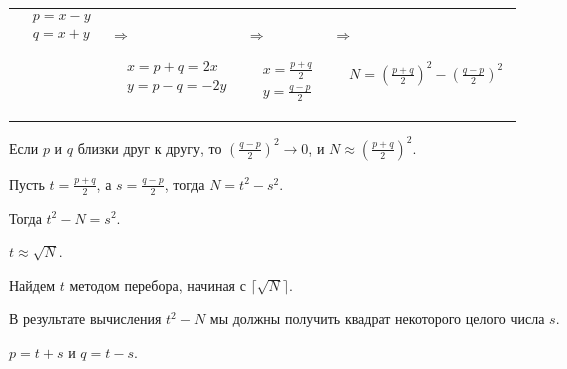 \documentclass[a4paper, 14pt]{report}
\begin{document}
\begin{center}
    \begin{tabularx}{\textwidth}{p{4em}|p{10em}|p{8em}|p{15em}}
        $\begin{aligned}
                  & p = x - y \\
                  & q = x + y \\
             \end{aligned}$          &
        \begin{minipage}{1em}
            $\Rightarrow$
        \end{minipage}
        $\begin{aligned}
                  & x = p + q = 2x  \\
                  & y = p - q = -2y \\
             \end{aligned}$     &
        \begin{minipage}{1em}
            $\Rightarrow$
        \end{minipage}
        $\begin{aligned}
                  & x = \frac{p + q}{2} \\
                  & y = \frac{q - p}{2}
             \end{aligned}$ &
        \begin{minipage}{1em}
            $\Rightarrow$
        \end{minipage}
        $\begin{aligned}
                  & N = \left( \frac{p + q}{2} \right)^2 - \left( \frac{q - p}{2} \right)^2 \\
             \end{aligned}$
    \end{tabularx}
\end{center}

Если $p$ и $q$ близки друг к другу, то $\left( \frac{q - p}{2} \right)^2 \to 0$, и $N \approx \left( \frac{p + q}{2} \right)^2$.

Пусть $t = \frac{p + q}{2}$, а $s = \frac{q - p}{2}$, тогда $N = t^2 - s^2$.

Тогда $t^2 - N = s^2$.

$t \approx \sqrt{N}$.

Найдем $t$ методом перебора, начиная с $\lceil \sqrt{N} \rceil$.

В результате вычисления $t^2 - N$ мы должны получить квадрат некоторого целого числа $s$.

$p = t + s$ и $q = t - s$.
\end{document}
